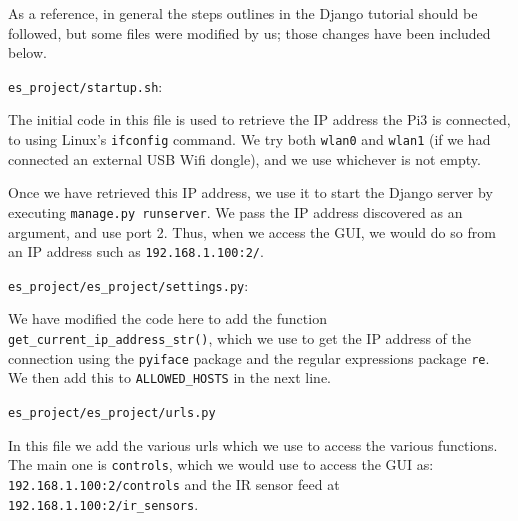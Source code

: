 
	
	As a reference, in general the steps outlines in the Django tutorial \cite{DjangoTutorial} should be followed, but some files were modified by us; those changes have been included below.
	
	\begin{description}[font=\quad $\circ$, topsep=6pt, itemsep=3em]
		\item \texttt{es\_project/startup.sh}:
		
			
			
			The initial code in this file is used to retrieve the IP address the Pi3 is connected, to using Linux's \texttt{ifconfig} command. We try both \texttt{wlan0} and \texttt{wlan1} (if we had connected an external USB Wifi dongle), and we use whichever is not empty. 
			
			Once we have retrieved this IP address, we use it to start the Django server by executing \texttt{manage.py runserver}. We pass the IP address discovered as an argument, and use port 2. Thus, when we access the GUI, we would do so from an IP address such as \texttt{192.168.1.100:2/}.
		
		
		
		\item \texttt{es\_project/es\_project/settings.py}:
			
			
			We have modified the code here to add the function \texttt{get\_current\_ip\_address\_str()}, which we use to get the IP address of the connection using the \texttt{pyiface} package and the regular expressions package \texttt{re}. We then add this to \texttt{ALLOWED\_HOSTS} in the next line.



		\item \texttt{es\_project/es\_project/urls.py}		
			
			
			In this file we add the various urls which we use to access the various functions. The main one is \texttt{controls}, which we would use to access the GUI as: \texttt{192.168.1.100:2/controls} and the IR sensor feed at \texttt{192.168.1.100:2/ir\_sensors}.
			

\end{description}
